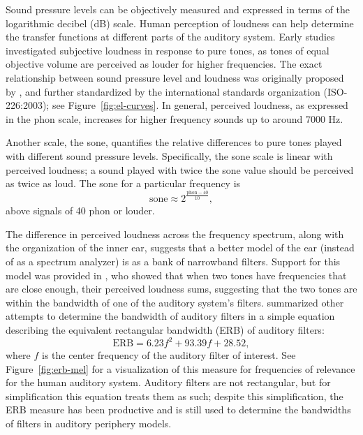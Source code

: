 Sound pressure levels can be objectively measured
and expressed in terms of the logarithmic
decibel (dB) scale.
Human perception of loudness can help
determine the transfer functions
at different parts of the auditory system.
Early studies investigated
subjective loudness in response
to pure tones,
as tones of equal objective volume
are perceived as louder for higher frequencies.
The exact relationship between
sound pressure level and
loudness was originally proposed
by \citet{fletcher1933},
and further standardized
by the international standards organization
(ISO-226:2003);
see Figure~\ref{fig:el-curves}.
In general, perceived loudness,
as expressed in the phon scale,
increases for higher frequency sounds
up to around 7000 Hz.


Another scale, the sone,
quantifies the relative differences
to pure tones played with
different sound pressure levels.
Specifically, the sone scale
is linear with perceived loudness;
a sound played with twice the sone value
should be perceived as twice as loud.
The sone for a particular frequency is
\begin{equation*}
  \text{sone} \approx 2^{\frac{\text{phon} - 40}{10}},
\end{equation*}
above signals of 40 phon or louder.

The difference in perceived loudness
across the frequency spectrum,
along with the organization
of the inner ear,
suggests that a better model
of the ear (instead of as a spectrum analyzer)
is as a bank of narrowband filters.
Support for this model was provided
in \citet{zwicker1957},
who showed that when two tones
have frequencies that are close enough,
their perceived loudness sums,
suggesting that the two tones
are within the bandwidth of one of the
auditory system's filters.
\citet{moore1983}
summarized other attempts to
determine the bandwidth
of auditory filters
in a simple equation
describing the equivalent
rectangular bandwidth (ERB)
of auditory filters:
\begin{equation}
  \text{ERB} = 6.23 f^2 + 93.39 f + 28.52,
\end{equation}
where $f$ is the center frequency
of the auditory filter of interest.
See Figure~\ref{fig:erb-mel} for a visualization of
this measure for frequencies of relevance
for the human auditory system.
Auditory filters are not rectangular,
but for simplification this equation
treats them as such;
despite this simplification,
the ERB measure has been productive and is still used
to determine the bandwidths
of filters in auditory periphery models.

